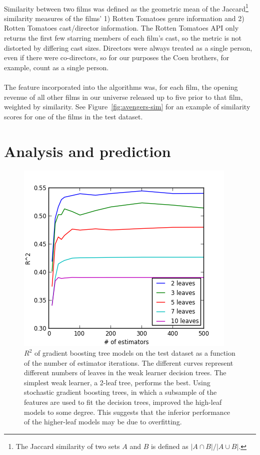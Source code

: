 \documentclass[10pt]{article}
\begin{document}
    \paragraph{}
    Similarity between two films was defined as the geometric mean of the Jaccard\footnote{The Jaccard similarity of two sets $A$ and $B$ is defined as $|A \cap B| / |A \cup B|$.} similarity measures of the films' 1) Rotten Tomatoes genre information and 2) Rotten Tomatoes cast/director information. The Rotten Tomatoes API only returns the first few starring members of each film's cast, so the metric is not distorted by differing cast sizes. Directors were always treated as a single person, even if there were co-directors, so for our purposes the Coen brothers, for example, count as a single person. 
    
    \paragraph{}
    The feature incorporated into the algorithms was, for each film, the opening revenue of all other films in our universe released up to five prior to that film, weighted by similarity. See Figure~\ref{fig:avengers-sim} for an example of similarity scores for one of the films in the test dataset. 
    
    \section{Analysis and prediction}
    
    \begin{figure}[ht]
        \centering
        \includegraphics{test_r2s.png}
        \caption{$R^2$ of gradient boosting tree models on the test dataset as a function of the number of estimator iterations. The different curves represent different numbers of leaves in the weak learner decision trees. The simplest weak learner, a 2-leaf tree, performs the best. Using stochastic gradient boosting trees, in which a subsample of the features are used to fit the decision trees, improved the high-leaf models to some degree. This suggests that the inferior performance of the higher-leaf models may be due to overfitting.}
        \label{fig:gradient-params}
    \end{figure}
    
\end{document}
